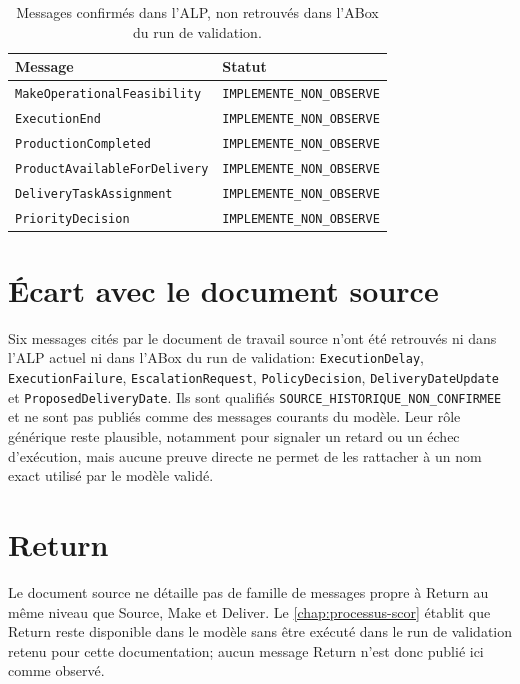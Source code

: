 \begin{table}[H]
  \centering
  \small
  \begin{tabularx}{\textwidth}{L{0.30\textwidth} Y}
    \toprule
    Message & Statut \\
    \midrule
    \texttt{Make\allowbreak Operational\allowbreak Feasibility} & \texttt{IMPLEMENTE\_\allowbreak NON\_\allowbreak OBSERVE} \\
    \texttt{Execution\allowbreak End} & \texttt{IMPLEMENTE\_\allowbreak NON\_\allowbreak OBSERVE} \\
    \texttt{Production\allowbreak Completed} & \texttt{IMPLEMENTE\_\allowbreak NON\_\allowbreak OBSERVE} \\
    \texttt{Product\allowbreak Available\allowbreak For\allowbreak Delivery} & \texttt{IMPLEMENTE\_\allowbreak NON\_\allowbreak OBSERVE} \\
    \texttt{Delivery\allowbreak Task\allowbreak Assignment} & \texttt{IMPLEMENTE\_\allowbreak NON\_\allowbreak OBSERVE} \\
    \texttt{Priority\allowbreak Decision} & \texttt{IMPLEMENTE\_\allowbreak NON\_\allowbreak OBSERVE} \\
    \bottomrule
  \end{tabularx}
  \caption{Messages confirmés dans l'ALP, non retrouvés dans l'ABox du run de validation.}
  \label{tab:messages-non-observes}
\end{table}

\section{Écart avec le document source}

Six messages cités par le document de travail source n'ont été retrouvés ni dans l'ALP actuel ni dans l'ABox du run de validation: \texttt{Execution\allowbreak Delay}, \texttt{Execution\allowbreak Failure}, \texttt{Escalation\allowbreak Request}, \texttt{Policy\allowbreak Decision}, \texttt{Delivery\allowbreak Date\allowbreak Update} et \texttt{Proposed\allowbreak Delivery\allowbreak Date}. Ils sont qualifiés \texttt{SOURCE\_\allowbreak HISTORIQUE\_\allowbreak NON\_\allowbreak CONFIRMEE} et ne sont pas publiés comme des messages courants du modèle. Leur rôle générique reste plausible, notamment pour signaler un retard ou un échec d'exécution, mais aucune preuve directe ne permet de les rattacher à un nom exact utilisé par le modèle validé.

\section{Return}

Le document source ne détaille pas de famille de messages propre à Return au même niveau que Source, Make et Deliver. Le \cref{chap:processus-scor} établit que Return reste disponible dans le modèle sans être exécuté dans le run de validation retenu pour cette documentation; aucun message Return n'est donc publié ici comme observé.
